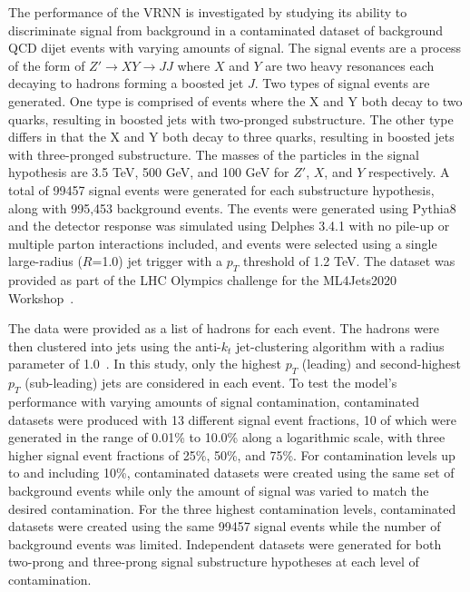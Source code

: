 \documentclass[12pt, a4paper]{article}
\begin{document}
The performance of the VRNN is investigated by studying its ability to discriminate signal from background in a contaminated dataset of background QCD dijet events with varying amounts of signal. The signal events are a process of the form of $Z'\rightarrow XY \rightarrow JJ$ where $X$ and $Y$ are two heavy resonances each decaying to hadrons forming a boosted jet $J$. Two types of signal events are generated. One type is comprised of events where the X and Y both decay to two quarks, resulting in boosted jets with two-pronged substructure. The other type differs in that the X and Y both decay to three quarks, resulting in boosted jets with three-pronged substructure. The masses of the particles in the signal hypothesis are 3.5 TeV, 500 GeV, and 100 GeV for $Z'$, $X$, and $Y$ respectively. A total of 99457 signal events were generated for each substructure hypothesis, along with 995,453 background events. The events were generated using {\sc Pythia8} and the detector response was simulated using {\sc Delphes 3.4.1} with no pile-up or multiple parton interactions included, and events were selected using a single large-radius ($R$=1.0) jet trigger with a $p_T$ threshold of 1.2 TeV. The dataset was provided as part of the LHC Olympics challenge for the ML4Jets2020 Workshop~\cite{dataset}. 

The data were provided as a list of hadrons for each event. The hadrons were then clustered into jets using the anti-$k_{t}$ jet-clustering algorithm with a radius parameter of 1.0~\cite{Cacciari_2008}. In this study, only the highest $p_{T}$ (leading) and second-highest $p_{T}$ (sub-leading) jets are considered in each event. To test the model's performance with varying amounts of signal contamination, contaminated datasets were produced with 13 different signal event fractions, 10 of which were generated in the range of 0.01\% to 10.0\% along a logarithmic scale, with three higher signal event fractions of 25\%, 50\%, and 75\%. For contamination levels up to and including 10\%, contaminated datasets were created using the same set of background events while only the amount of signal was varied to match the desired contamination. For the three highest contamination levels, contaminated datasets were created using the same 99457 signal events while the number of background events was limited. 
Independent datasets were generated for both two-prong and three-prong signal substructure hypotheses at each level of contamination.
\end{document}
